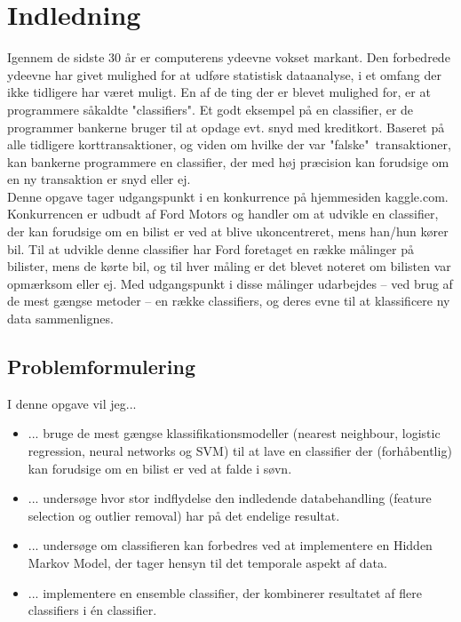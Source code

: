 \section{Indledning}
Igennem de sidste 30 år er computerens ydeevne vokset markant. Den forbedrede ydeevne har givet mulighed for at udføre statistisk dataanalyse, i et omfang der ikke tidligere har været muligt. En af de ting der er blevet mulighed for, er at programmere såkaldte "classifiers". Et godt eksempel på en classifier, er de programmer bankerne bruger til at opdage evt. snyd med kreditkort. Baseret på alle tidligere korttransaktioner, og viden om hvilke der var "falske"\ transaktioner, kan bankerne programmere en classifier, der med høj præcision kan forudsige om en ny transaktion er snyd eller ej. \\
Denne opgave tager udgangspunkt i en konkurrence på hjemmesiden kaggle.com. Konkurrencen er udbudt af Ford Motors og handler om at udvikle en classifier, der kan forudsige om en bilist er ved at blive ukoncentreret, mens han/hun kører bil. Til at udvikle denne classifier har Ford foretaget en række målinger på bilister, mens de kørte bil, og til hver måling er det blevet noteret om bilisten var opmærksom eller ej. Med udgangspunkt i disse målinger udarbejdes -- ved brug af de mest gængse metoder -- en række classifiers, og deres evne til at klassificere ny data sammenlignes.

\subsection{Problemformulering}
I denne opgave vil jeg...
\begin{itemize}
    \item ... bruge de mest gængse klassifikationsmodeller (nearest neighbour, logistic regression, neural networks og SVM) til at lave en classifier der (forhåbentlig) kan forudsige om en bilist er ved at falde i søvn.
    \item ... undersøge hvor stor indflydelse den indledende databehandling (feature selection og outlier removal) har på det endelige resultat.
    \item ... undersøge om classifieren kan forbedres ved at implementere en Hidden Markov Model, der tager hensyn til det temporale aspekt af data.
    \item ... implementere en ensemble classifier, der kombinerer resultatet af flere classifiers i én classifier.
\end{itemize}
    
